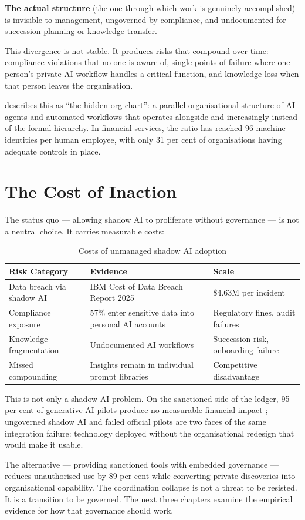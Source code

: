 \textbf{The actual structure} (the one through which work is genuinely accomplished) is invisible to management, ungoverned by compliance, and undocumented for succession planning or knowledge transfer.

This divergence is not stable. It produces risks that compound over time: compliance violations that no one is aware of, single points of failure where one person's private AI workflow handles a critical function, and knowledge loss when that person leaves the organisation.

\textcite{CyberArk2025} describes this as ``the hidden org chart'': a parallel organisational structure of AI agents and automated workflows that operates alongside and increasingly instead of the formal hierarchy. In financial services, the ratio has reached 96 machine identities per human employee, with only 31 per cent of organisations having adequate controls in place.

\section{The Cost of Inaction}

The status quo --- allowing shadow AI to proliferate without governance --- is not a neutral choice. It carries measurable costs:

\begin{table}[h]
\centering
\caption{Costs of unmanaged shadow AI adoption}
\label{tab:shadow-ai-costs}
\begin{tabularx}{\textwidth}{L{4cm}L{5cm}X}
\toprule
\textbf{Risk Category} & \textbf{Evidence} & \textbf{Scale} \\
\midrule
Data breach via shadow AI & IBM Cost of Data Breach Report 2025 & \$4.63M per incident \\
Compliance exposure & 57\% enter sensitive data into personal AI accounts & Regulatory fines, audit failures \\
Knowledge fragmentation & Undocumented AI workflows & Succession risk, onboarding failure \\
Missed compounding & Insights remain in individual prompt libraries & Competitive disadvantage \\
\bottomrule
\end{tabularx}
\end{table}

This is not only a shadow AI problem. On the sanctioned side of the ledger, 95 per cent of generative AI pilots produce no measurable financial impact \parencite{MITNANDA2025}; ungoverned shadow AI and failed official pilots are two faces of the same integration failure: technology deployed without the organisational redesign that would make it usable.

The alternative --- providing sanctioned tools with embedded governance --- reduces unauthorised use by 89 per cent while converting private discoveries into organisational capability. The coordination collapse is not a threat to be resisted. It is a transition to be governed. The next three chapters examine the empirical evidence for how that governance should work.
